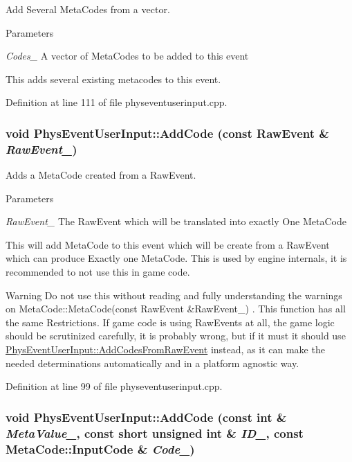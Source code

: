 Add Several MetaCodes from a vector. 


\begin{DoxyParams}{Parameters}
\item[{\em Codes\_\-}]A vector of MetaCodes to be added to this event\end{DoxyParams}
This adds several existing metacodes to this event. 

Definition at line 111 of file physeventuserinput.cpp.

\hypertarget{classPhysEventUserInput_a385a4f7a6e88be43b6ba1ffc2a1bb5e3}{
\subsubsection[{AddCode}]{\setlength{\rightskip}{0pt plus 5cm}void PhysEventUserInput::AddCode (const RawEvent \& {\em RawEvent\_\-})}}
\label{dc/d0e/classPhysEventUserInput_a385a4f7a6e88be43b6ba1ffc2a1bb5e3}


Adds a MetaCode created from a RawEvent. 


\begin{DoxyParams}{Parameters}
\item[{\em RawEvent\_\-}]The RawEvent which will be translated into exactly One MetaCode\end{DoxyParams}
This will add MetaCode to this event which will be create from a RawEvent which can produce Exactly one MetaCode. This is used by engine internals, it is recommended to not use this in game code. \begin{DoxyWarning}{Warning}
Do not use this without reading and fully understanding the warnings on MetaCode::MetaCode(const RawEvent \&RawEvent\_\-) . This function has all the same Restrictions. If game code is using RawEvents at all, the game logic should be scrutinized carefully, it is probably wrong, but if it must it should use \hyperlink{classPhysEventUserInput_a9e42f42f9a4a42f792e5cf95856669c0}{PhysEventUserInput::AddCodesFromRawEvent} instead, as it can make the needed determinations automatically and in a platform agnostic way. 
\end{DoxyWarning}


Definition at line 99 of file physeventuserinput.cpp.

\hypertarget{classPhysEventUserInput_ace3b98a502b8e784b58bc5dc599fc0c4}{
\subsubsection[{AddCode}]{\setlength{\rightskip}{0pt plus 5cm}void PhysEventUserInput::AddCode (const int \& {\em MetaValue\_\-}, \/  const short unsigned int \& {\em ID\_\-}, \/  const {\bf MetaCode::InputCode} \& {\em Code\_\-})}}
\label{dc/d0e/classPhysEventUserInput_ace3b98a502b8e784b58bc5dc599fc0c4}


